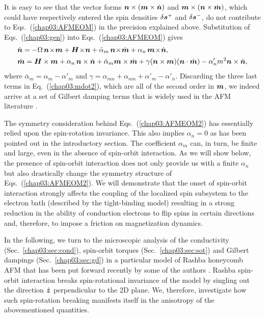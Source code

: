 It is easy to see that the vector forms $\boldsymbol{n}\times(\boldsymbol{m}\times\dot{\boldsymbol{n}})$ and $\boldsymbol{m}\times(\boldsymbol{n}\times \dot{\boldsymbol{m}})$, which could have respectively entered the spin densities $\delta\boldsymbol{s}^+$ and $\delta\boldsymbol{s}^-$, do not contribute to Eqs.~(\ref{chap03:AFMEOM}) in the precision explained above.  
Substitution of Eqs.~(\ref{chap03:gen}) into Eqs.~(\ref{chap03:AFMEOM}) gives 
\beml
\label{chap03:AFMEOM2}
\begin{align}
\label{chap03:ndot2}
&\dot{\bb{n}} = -\Omega\, \bb{n}\!\times\!\bb{m} +\bb{H}\!\times\!\bb{n}+\bar{\alpha}_m\,\bb{n}\!\times\!\dot{\bb{m}}+\alpha_n\,\bb{m}\!\times\! \dot{\bb{n}},\\
&\dot{\bb{m}} =\bb{H}\times\bb{m}+\alpha_n\,\bb{n} \times \dot{\bb{n}}\n+\bar{\alpha}_m \bb{m} \times \dot{\bb{m}} +\gamma (\bb{n}\times\bb{m})(\bb{n}\cdot\dot{\bb{m}}) - \alpha_n'm^2\bb{n}\times\dot{\bb{n}},
\label{chap03:mdot2}
\end{align}
\eml
where $\bar{\alpha}_m=\alpha_m\!-\!\alpha'_m$ and $\gamma=\alpha_{mn}\!+\!\alpha_{nm}\!+\!\alpha'_m\!-\!\alpha'_n$. Discarding the three last terms in Eq.~(\ref{chap03:mdot2}), which are all of the second order in $\boldsymbol{m}$, we indeed arrive at a set of Gilbert damping terms that is  widely used in the AFM literature \cite{Kamra2018,PhysRevMaterials.1.061401,Yuan_2019}. 

The symmetry consideration behind Eqs.~(\ref{chap03:AFMEOM2}) has essentially relied upon the spin-rotation invariance. This also implies $\alpha_n=0$ as has been pointed out in the introductory section. The coefficient $\alpha_m$ can, in turn, be finite and large, even in the absence of spin-orbit interaction. As we will show below, the presence of spin-orbit interaction does not only provide us with a finite $\alpha_n$ but also drastically change the symmetry structure of Eqs.~(\ref{chap03:AFMEOM2}). We will demonstrate that the onset of spin-orbit interaction strongly affects the coupling of the localized spin subsystem to the electron bath (described by the tight-binding model) resulting in a strong reduction in the ability of conduction electrons to flip spins in certain directions and, therefore, to impose a friction on magnetization dynamics. 

In the following, we turn to the microscopic analysis of the conductivity (Sec.~\ref{chap03:sec:cond}), spin-orbit torques (Sec.~\ref{chap03:sec:sot}) and Gilbert dampings (Sec.~\ref{chap03:sec:gd}) in a particular model of Rashba honeycomb AFM that has been put forward recently by some of the authors \cite{sumit2019}. Rashba spin-orbit interaction breaks spin-rotational invariance of the model by singling out the direction $\hat{\boldsymbol{z}}$ perpendicular to the 2D plane. We, therefore, investigate how such spin-rotation breaking manifests itself in the anisotropy of the abovementioned quantities.  

